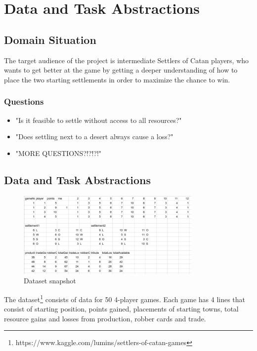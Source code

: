 \documentclass{article}
\begin{document}
\section{Data and Task Abstractions} %

\subsection{Domain Situation}

The target audience of the project is intermediate Settlers of Catan
players, who wants to get better at the game by getting a deeper understanding
of how to place the two starting settlements in order to maximize the chance
to win.

\subsubsection{Questions}

\begin{itemize}
  \item "Is it feasible to settle without access to all resources?"
  \item "Does settling next to a desert always cause a loss?"
  \item "MORE QUESTIONS?!?!?!"
\end{itemize}

\subsection{Data and Task Abstractions}

\begin{figure}[h!]
    \centering
    \includegraphics[width=0.8\textwidth]{data.png}
    \caption{Dataset snapshot}
    \label{fig:data}
\end{figure}

The dataset\footnote{https://www.kaggle.com/lumins/settlers-of-catan-games}
consists of data for 50 4-player games. Each game has 4 lines that consist
of starting position, points gained, placements of starting towns, total
resource gains and losses from production, robber cards and trade.
\end{document}
